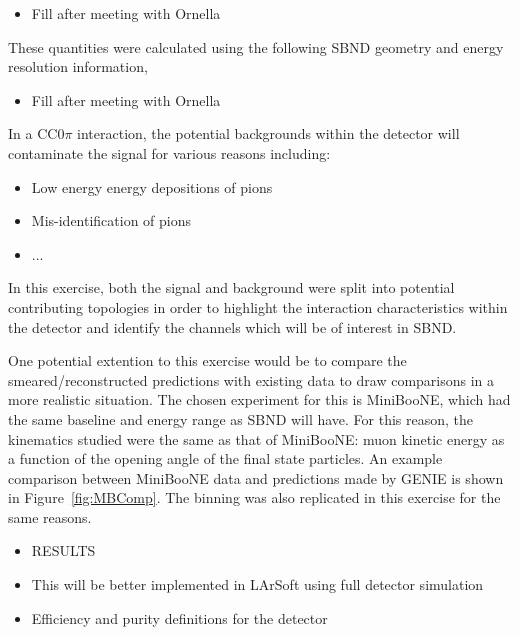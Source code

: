 \begin{itemize}
    \item Fill after meeting with Ornella
\end{itemize}

These quantities were calculated using the following SBND geometry and energy resolution information,

\begin{itemize}
    \item Fill after meeting with Ornella
\end{itemize}

In a CC0\(\pi\) interaction, the potential backgrounds within the detector will contaminate the signal for various reasons including:

\begin{itemize}
    \item Low energy energy depositions of pions
    \item Mis-identification of pions
    \item ...
\end{itemize}

In this exercise, both the signal and background were split into potential contributing topologies in order to highlight the interaction characteristics within the detector and identify the channels which will be of interest in SBND. 
   
One potential extention to this exercise would be to compare the smeared/reconstructed predictions with existing data to draw comparisons in a more realistic situation. The chosen experiment for this is MiniBooNE, which had the same baseline and energy range as SBND will have. For this reason, the kinematics studied were the same as that of MiniBooNE: muon kinetic energy as a function of the opening angle of the final state particles. An example comparison between
MiniBooNE data and predictions made by GENIE is shown in Figure~\ref{fig:MBComp}. The binning was also replicated in this exercise for the same reasons.


    \begin{itemize}
        \item RESULTS
        \item This will be better implemented in LArSoft using full detector simulation
        \item Efficiency and purity definitions for the detector
    \end{itemize}


\clearpage
